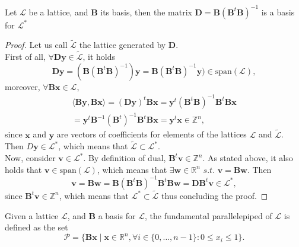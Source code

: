 \begin{theorem}
Let $\mathscr{L}$ be a lattice, and $\mathbf{B}$ its basis, then the matrix $\mathbf{D}=\mathbf{B}(\mathbf{B}^{t}\mathbf{B})^{-1}$ is a basis for $\mathscr{L}^*$
\end{theorem}
\begin{proof}
Let us call $\tilde{\mathscr{L}}$ the lattice generated by $\mathbf{D}$.\\
First of all, $\forall{\mathbf{Dy}} \in \tilde{\mathscr{L}}$, it holds
\begin{equation*}
\mathbf{Dy} = (\mathbf{B}(\mathbf{B}^{t}\mathbf{B})^{-1})\mathbf{y} = \mathbf{B}(\mathbf{B}^{t}\mathbf{B})^{-1}\mathbf{y}) \in \mathrm{span}(\mathscr{L}),
\end{equation*}
moreover, $\forall \mathbf{Bx}\in\mathscr{L}$,
\begin{equation*}
\begin{aligned}
\langle \mathbf{By},\mathbf{Bx} \rangle = (\mathbf{Dy})^{t}\mathbf{Bx} = \mathbf{y}^{t} (\mathbf{B}^t\mathbf{B})^{-1}\mathbf{B}^t\mathbf{B}\mathbf{x}\\
= \mathbf{y}^{t} \mathbf{B}^{-1}(\mathbf{B}^t)^{-1}\mathbf{B}^t\mathbf{Bx} = \mathbf{y}^t\mathbf{x} \in \mathbb{Z}^n,
\end{aligned}
\end{equation*}
since $\mathbf{x}$ and $\mathbf{y}$ are vectors of coefficients for elements of the lattices $\mathscr{L}$ and $\tilde{\mathscr{L}}$. Then $D\mathbf{y}\in\mathscr{L}^*$, which means that $\tilde{\mathscr{L}}\subset\mathscr{L}^*$.\\
Now, consider $\mathbf{v}\in\mathscr{L}^*$. By definition of dual, $\mathbf{B}^t\mathbf{v}\in\mathbb{Z}^n$. As stated above, it also holds that $\mathbf{v}\in \mathrm{span}(\mathscr{L})$, which means that $\exists\mathbf{w}\in\mathbb{R}^n$ $s.t.$ $\mathbf{v}=\mathbf{Bw}$. Then
\begin{equation*}
\mathbf{v} = \mathbf{Bw} = \mathbf{B}(\mathbf{B}^t\mathbf{B})^{-1}\mathbf{B}^t\mathbf{B}\mathbf{w} = \mathbf{DB}^t\mathbf{v} \in \mathscr{L}^*,
\end{equation*}
since $\mathbf{B}^t\mathbf{v}\in\mathbb{Z}^n$, which means that $\mathscr{L}^*\subset\tilde{\mathscr{L}}$ thus concluding the proof.
\end{proof}

\begin{definition}
Given a lattice $\mathscr{L}$, and $\mathbf{B}$ a basis for $\mathscr{L}$, the fundamental parallelepiped of $\mathscr{L}$ is defined as the set
\begin{equation*}
\mathscr{P} = \{\mathbf{Bx}\mid\mathbf{x}\in\mathbb{R}^n, \forall i \in \{0,\ldots,n-1\}:0\leq x_i \leq 1 \}.
\end{equation*}
\end{definition}


